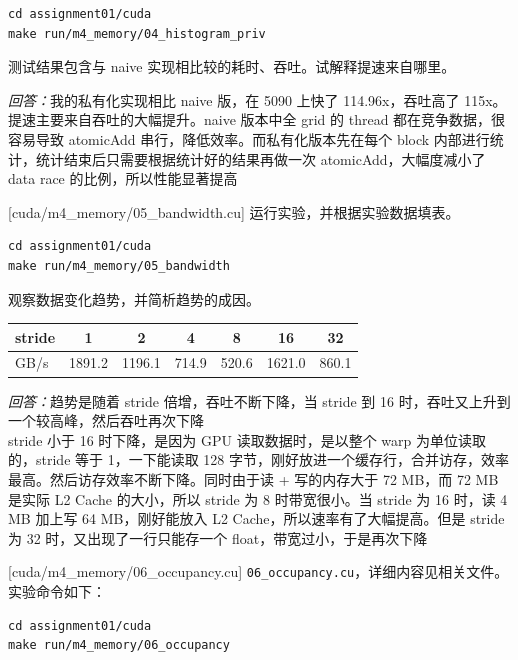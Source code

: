 \documentclass[11pt,a4paper,fontset=none]{ctexart}
\begin{document}
\begin{lstlisting}
cd assignment01/cuda
make run/m4_memory/04_histogram_priv
\end{lstlisting}

测试结果包含与 naive 实现相比较的耗时、吞吐。试解释提速来自哪里。
\par\noindent\textit{回答：}我的私有化实现相比 naive 版，在 5090 上快了 114.96x，吞吐高了 115x。\\
提速主要来自吞吐的大幅提升。naive 版本中全 grid 的 thread 都在竞争数据，很容易导致 atomicAdd 串行，降低效率。而私有化版本先在每个 block 内部进行统计，统计结束后只需要根据统计好的结果再做一次 atomicAdd，大幅度减小了 data race 的比例，所以性能显著提高

[cuda/m4\_memory/05\_bandwidth.cu]
运行实验，并根据实验数据填表。

\begin{lstlisting}
cd assignment01/cuda
make run/m4_memory/05_bandwidth
\end{lstlisting}

观察数据变化趋势，并简析趋势的成因。

\begin{center}\small
\begin{tabular}{@{}lcccccc@{}}
\toprule
stride & 1 & 2 & 4 & 8 & 16 & 32 \\
\midrule
GB/s & 1891.2 & 1196.1 & 714.9 & 520.6 & 1621.0 & 860.1\\
\bottomrule
\end{tabular}
\end{center}

\par\noindent\textit{回答：}趋势是随着 stride 倍增，吞吐不断下降，当 stride 到 16 时，吞吐又上升到一个较高峰，然后吞吐再次下降\\
stride 小于 16 时下降，是因为 GPU 读取数据时，是以整个 warp 为单位读取的，stride 等于 1，一下能读取 128 字节，刚好放进一个缓存行，合并访存，效率最高。然后访存效率不断下降。同时由于读 + 写的内存大于 72 MB，而 72 MB 是实际 L2 Cache 的大小，所以 stride 为 8 时带宽很小。当 stride 为 16 时，读 4 MB 加上写 64 MB，刚好能放入 L2 Cache，所以速率有了大幅提高。但是 stride 为 32 时，又出现了一行只能存一个 float，带宽过小，于是再次下降

[cuda/m4\_memory/06\_occupancy.cu]
\texttt{06\_occupancy.cu}，详细内容见相关文件。实验命令如下：

\begin{lstlisting}
cd assignment01/cuda
make run/m4_memory/06_occupancy
\end{lstlisting}
\end{document}
